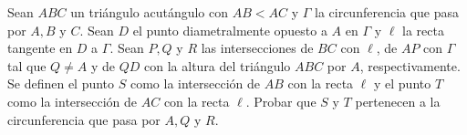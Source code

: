 Sean $A B C$ un triángulo acutángulo con $A B\lt A  C$ y $\Gamma$ la circunferencia que pasa por $A, B$ y $C$. Sean $D$ el punto diametralmente opuesto a $A$ en $\Gamma$ y $\ell$ la recta tangente en $D$ a $\Gamma$. Sean $P, Q$ y $R$ las intersecciones de $B C$ con $\ell$, de $A P$ con $\Gamma$ tal que $Q \neq A$ y de $Q D$ con la altura del triángulo $A B C$ por $A$, respectivamente. Se definen el punto $S$ como la intersección de $A B$ con la recta $\ell$ y el punto $T$ como la intersección de $A C$ con la recta $\ell$. Probar que $S$ y $T$ pertenecen a la circunferencia que pasa por $A, Q$ y $R$.